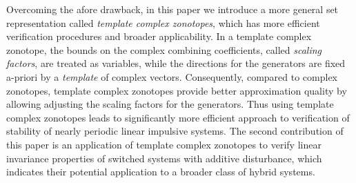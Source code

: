 Overcoming the afore drawback, in this paper we introduce a
more general set representation called \emph{template complex
zonotopes}, which has more efficient verification procedures and
broader applicability.  In a {template complex zonotope}, the bounds
on the complex combining coefficients, called \emph{scaling factors},
are treated as variables, while the directions for the generators are
fixed a-priori by a \emph{template} of complex vectors. Consequently,
compared to complex zonotopes, template complex zonotopes provide
better approximation quality by allowing adjusting the scaling factors
for the generators. Thus using template complex zonotopes leads to
significantly more efficient approach to verification of stability of
nearly periodic linear impulsive systems.  The second contribution of
this paper is an application of template complex zonotopes to verify
linear invariance properties of switched systems with additive
disturbance, which indicates their potential application to a broader
class of hybrid systems.  %


